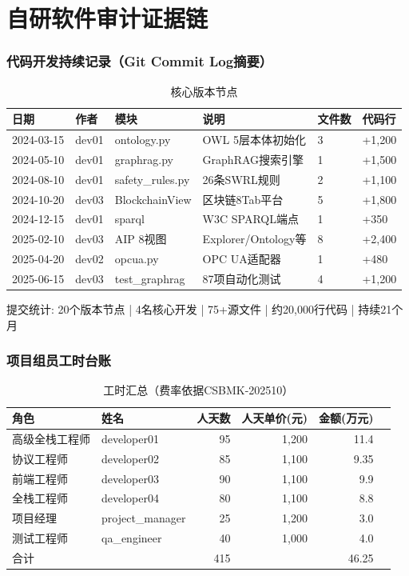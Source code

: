 \documentclass[12pt,a4paper]{ctexart}
\begin{document}
\newpage
\part{自研软件审计证据链}

\section{代码开发持续记录（Git Commit Log摘要）}
\begin{table}[H]\centering\caption{核心版本节点}\begin{tabular}{@{}llllll@{}}
\toprule
日期 & 作者 & 模块 & 说明 & 文件数 & 代码行 \\
\midrule
2024-03-15 & dev01 & ontology.py & OWL 5层本体初始化 & 3 & +1,200 \\
2024-05-10 & dev01 & graphrag.py & GraphRAG搜索引擎 & 1 & +1,500 \\
2024-08-10 & dev01 & safety\_rules.py & 26条SWRL规则 & 2 & +1,100 \\
2024-10-20 & dev03 & BlockchainView & 区块链8Tab平台 & 5 & +1,800 \\
2024-12-15 & dev01 & sparql & W3C SPARQL端点 & 1 & +350 \\
2025-02-10 & dev03 & AIP 8视图 & Explorer/Ontology等 & 8 & +2,400 \\
2025-04-20 & dev02 & opcua.py & OPC UA适配器 & 1 & +480 \\
2025-06-15 & dev03 & test\_graphrag & 87项自动化测试 & 4 & +1,200 \\
\bottomrule
\end{tabular}\end{table}
\vspace{6pt}
提交统计: 20个版本节点 | 4名核心开发 | 75+源文件 | 约20,000行代码 | 持续21个月

\section{项目组员工时台账}
\begin{table}[H]\centering
\caption{工时汇总（费率依据CSBMK-202510）}
\begin{tabular}{@{}llrrrr@{}}
\toprule
角色 & 姓名 & 人天数 & 人天单价(元) & 金额(万元) \\
\midrule
高级全栈工程师 & developer01 & 95 & 1,200 & 11.4 \\
协议工程师 & developer02 & 85 & 1,100 & 9.35 \\
前端工程师 & developer03 & 90 & 1,100 & 9.9 \\
全栈工程师 & developer04 & 80 & 1,100 & 8.8 \\
项目经理 & project\_manager & 25 & 1,200 & 3.0 \\
测试工程师 & qa\_engineer & 40 & 1,000 & 4.0 \\
\midrule
合计 & & 415 & & 46.25 \\
\bottomrule
\end{tabular}\end{table}
\end{document}
